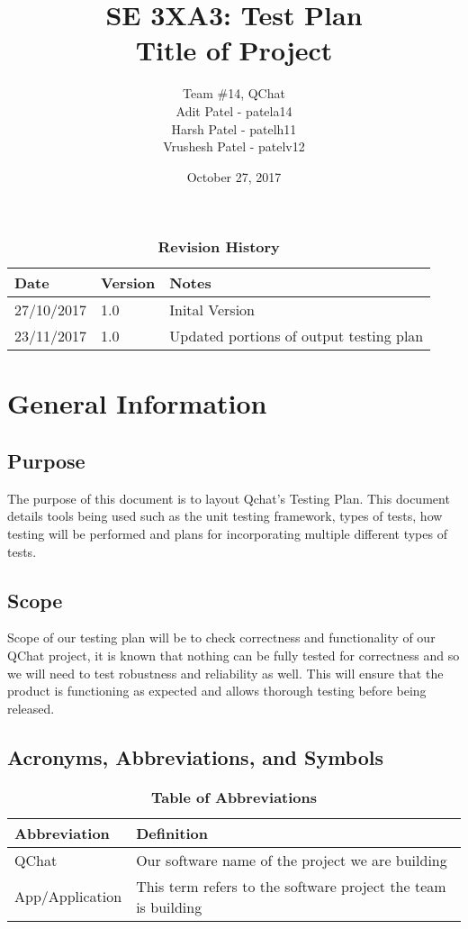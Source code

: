 \documentclass[12pt, titlepage]{article}
\title{SE 3XA3: Test Plan\\Title of Project}
\author{Team \#14, QChat
		\\ Adit Patel - patela14
		\\ Harsh Patel - patelh11
		\\ Vrushesh Patel - patelv12
}
\date{October 27, 2017}
\begin{document}
\maketitle

\tableofcontents
\listoftables
\listoffigures


\begin{table}[bp]
\caption{\bf Revision History}
\begin{tabularx}{\textwidth}{p{3cm}p{2cm}X}
\toprule {\bf Date} & {\bf Version} & {\bf Notes}\\
\midrule
27/10/2017 & 1.0 & Inital Version\\
23/11/2017 & 1.0 & Updated portions of output testing plan\\
\bottomrule
\end{tabularx}
\end{table}


\newpage


\section{General Information}

\subsection{Purpose}
The purpose of this document is to layout Qchat’s Testing Plan. This document details tools being used such as the unit testing framework, types of tests, how testing will be performed and plans for incorporating multiple different types of tests. 

\subsection{Scope}
Scope of our testing plan will be to check correctness and functionality of our QChat project, it is known that nothing can be fully tested for correctness and so we will need to test robustness and reliability as well. This will ensure that the product is functioning as expected and allows thorough testing before being released. 

\subsection{Acronyms, Abbreviations, and Symbols}
	
\begin{table}[hbp]
\caption{\textbf{Table of Abbreviations}} \label{Table}

\begin{tabularx}{\textwidth}{p{3cm}X}
\toprule
\textbf{Abbreviation} & \textbf{Definition} \\
\midrule
QChat & Our software name of the project we are building\\
App/Application & This term refers to the software project the team is building\\
\bottomrule
\end{tabularx}

\end{table}
\end{document}
